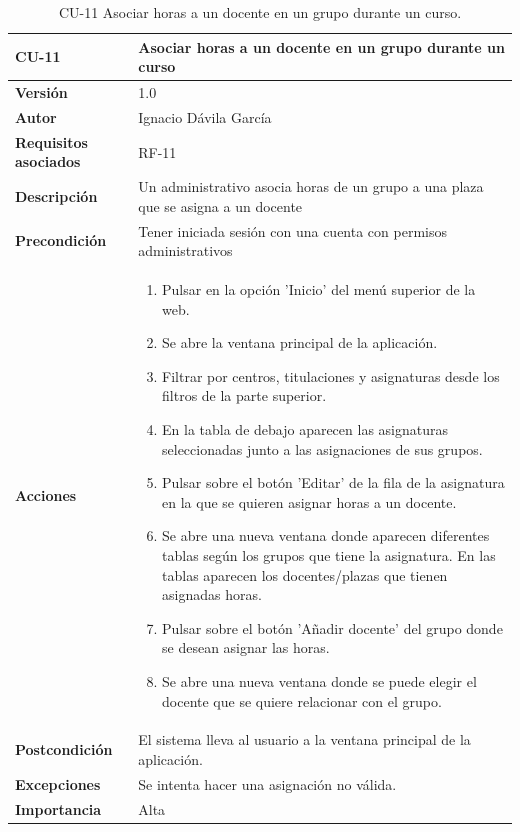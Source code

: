 \begin{table}[p]
	\centering
	\begin{tabularx}{\linewidth}{ p{} p{} }
		\toprule
		\textbf{CU-11}    & \textbf{Asociar horas a un docente en un grupo durante un curso}\\
		\toprule
		\textbf{Versión}              & 1.0    \\
		\textbf{Autor}                & Ignacio Dávila García \\
		\textbf{Requisitos asociados} & RF-11 \\
		\textbf{Descripción}          & Un administrativo asocia horas de un grupo a una plaza que se asigna a un docente \\
		\textbf{Precondición}         & Tener iniciada sesión con una cuenta con permisos administrativos \\
		\textbf{Acciones}             &
		\begin{enumerate}
			\def\labelenumi{\arabic{enumi}.}
			\tightlist
			\item Pulsar en la opción 'Inicio' del menú superior de la web.
			\item Se abre la ventana principal de la aplicación.
			\item Filtrar por centros, titulaciones y asignaturas desde los filtros de la parte superior.
			\item En la tabla de debajo aparecen las asignaturas seleccionadas junto a las asignaciones de sus grupos.
			\item Pulsar sobre el botón 'Editar' de la fila de la asignatura en la que se quieren asignar horas a un docente.
			\item Se abre una nueva ventana donde aparecen diferentes tablas según los grupos que tiene la asignatura. En las tablas aparecen los docentes/plazas que tienen asignadas horas.
			\item Pulsar sobre el botón 'Añadir docente' del grupo donde se desean asignar las horas.
			\item Se abre una nueva ventana donde se puede elegir el docente que se quiere relacionar con el grupo.
		\end{enumerate}\\
		\textbf{Postcondición}        & El sistema lleva al usuario a la ventana principal de la aplicación. \\
		\textbf{Excepciones}          & Se intenta hacer una asignación no válida. \\
		\textbf{Importancia}          & Alta \\
		\bottomrule
	\end{tabularx}
	\caption{CU-11 Asociar horas a un docente en un grupo durante un curso.}
\end{table}


